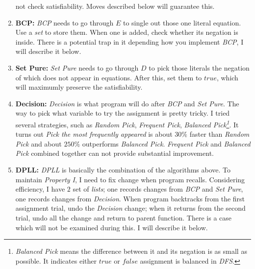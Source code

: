 \documentclass[a4paper,10pt]{article}
\begin{document}
\begin{enumerate}
    not check satisfiability. Moves described below will guarantee this.
\item \textbf{BCP:} \textit{BCP} needs to go through $E$ to single out those one literal
    equation. Use a \textit{set} to store them. When one is added, check whether 
    its negation is inside. There is a potential trap in it depending how you implement 
    \textit{BCP}, I will describe it below.
\item \textbf{Set Pure:} \textit{Set Pure} needs to go through $D$ to pick those literals
    the negation of which does not appear in equations. After this, set them to $true$,
    which will maximumly preserve the satisfiability.
\item \textbf{Decision:} \textit{Decision} is what program will do after
    \textit{BCP} and \textit{Set Pure}. The way to pick what variable to try the assignment
    is pretty tricky. I tried several strategies,
    such as \textit{Random Pick}, \textit{Frequent
    Pick}, \textit{Balanced Pick\footnote{\textit{Balanced Pick} means
    the difference between it and its negation is as small as possible. It indicates either
    $true$ or $false$ assignment is balanced in \textit{DFS}.}}. It turns out
    \textit{Pick the most frequently appeared} is about $30\%$ faster than \textit{Random
    Pick} and about $250\%$ outperforms \textit{Balanced Pick}. 
    \textit{Frequent Pick} and \textit{Balanced Pick} combined together
    can not provide substantial improvement. 
\item \textbf{DPLL:} \textit{DPLL} is basically the combination of the algorithms above. 
    To maintain \textit{Property I}, I need to fix change when program recalls.
    Considering
    efficiency, I have $2$ set of \textit{lists}; one records changes from \textit{BCP} and
    \textit{Set Pure}, one records changes from \textit{Decision}. When program backtracks
    from the first assignment trial,
    undo the \textit{Decision} change; when it returns from 
    the second trial, undo all the change and return to parent function.
    There is a case which will not be examined during this. I will describe 
    it below.
\end{enumerate}
\end{document}
